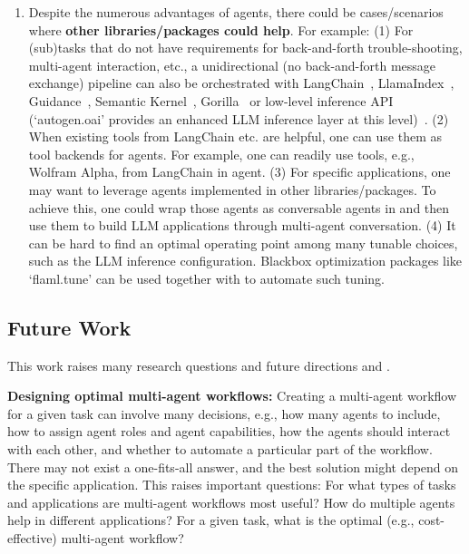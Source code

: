 \begin{enumerate}[leftmargin=*]
\item Despite the numerous advantages of \libName agents,  there could be cases/scenarios where {\bf other libraries/packages could help}. For example: (1) For (sub)tasks that do not have requirements for back-and-forth trouble-shooting, multi-agent interaction, etc., a unidirectional (no back-and-forth message exchange) pipeline can also be orchestrated with LangChain~\cite{langchain}, LlamaIndex~\cite{Liu_LlamaIndex_2022}, Guidance~\cite{guidance}, Semantic Kernel~\cite{sk}, Gorilla~\cite{patil2023gorilla} or low-level inference API (`autogen.oai' provides an enhanced LLM inference layer at this level)~\cite{dibia-2023-lida}. (2) When existing tools from LangChain etc. are helpful, one can use them as tool backends for \libName agents. For example, one can readily use tools, e.g., Wolfram Alpha, from LangChain in \libName agent. (3) For specific applications, one may want to leverage agents implemented in other libraries/packages. To achieve this, one could wrap those agents as conversable agents in \libName and then use them to build LLM applications through multi-agent conversation. (4) It can be hard to find an optimal operating point among many tunable choices, such as the LLM inference configuration. Blackbox optimization packages like `flaml.tune' \cite{wang2021flaml} can be used together with \libName to automate such tuning. 
\end{enumerate}

\subsection{Future Work}
This work raises many research questions and future directions and .

    \textbf{Designing optimal multi-agent workflows:} Creating a multi-agent workflow for a given task can involve many decisions, e.g., how many agents to include, how to assign agent roles and agent capabilities, how the agents should interact with each other, and whether to automate a particular part of the workflow. There may not exist a one-fits-all answer, and the best solution might depend on the specific application. 
    This raises important questions: For what types of tasks and applications are multi-agent workflows most useful?  How do multiple agents help in different applications? For a given task, what is the optimal (e.g., cost-effective) multi-agent workflow?


